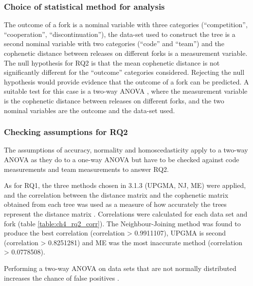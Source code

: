\subsubsection{Choice of statistical method for analysis}
The outcome of a fork is a nominal variable with three categories (“competition”, “cooperation”, “discontinuation”), the data-set used to construct the tree is a second nominal variable with two categories (“code” and “team”) and the cophenetic distance between releases on different forks is a measurement variable. The null hypothesis for RQ2 is that the mean cophenetic distance is not significantly different for the “outcome” categories considered. Rejecting the null hypothesis would provide evidence that the outcome of a fork can be predicted. A suitable test for this case is a two-way ANOVA \citep{McDonald2014b}, where the measurement variable is the cophenetic distance between releases on different forks, and the two nominal variables are the outcome and the data-set used.

\subsubsection{Checking assumptions for RQ2}
The assumptions of accuracy, normality and homoscedasticity apply to a two-way ANOVA as they do to a one-way ANOVA \citep[p.176]{McDonald2014b} but have to be checked against code measurements and team measurements to answer RQ2.


\noindent
As for RQ1, the three methods chosen in 3.1.3 (UPGMA, NJ, ME) were applied, and the correlation between the distance matrix and the cophenetic matrix obtained from each tree was used as a measure of how accurately the trees represent the distance matrix \citep{Rohlf2013a}. Correlations were calculated for each data set and fork (table \ref{table:ch4_rq2_corr}). The Neighbour-Joining method was found to produce the best correlation (correlation > 0.9911107), UPGMA is second (correlation > 0.8251281) and ME was the most inaccurate method (correlation > 0.0778508).




\noindent
Performing a two-way ANOVA on data sets that are not normally distributed increases the chance of false positives \citep[p.176]{McDonald2014b}.

